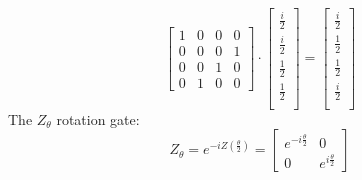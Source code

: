 \documentclass{article}
\begin{document}
\begin{itemize}
\begin{figure}[H]
    \end{figure}
    \[
        \begin{bmatrix}
            1 & 0 & 0 & 0\\
            0 & 0 & 0 & 1\\
            0 & 0 & 1 & 0\\
            0 & 1 & 0 & 0
        \end{bmatrix}
        \cdot
        \begin{bmatrix}
            \frac{i}{2} \\
            \frac{i}{2} \\
            \frac{1}{2} \\
            \frac{1}{2} \\
        \end{bmatrix}
        =
        \begin{bmatrix}
            \frac{i}{2} \\
            \frac{1}{2} \\
            \frac{1}{2} \\
            \frac{i}{2} \\
        \end{bmatrix}
    \]
    The \(Z_\theta\) rotation gate:
        \[
        Z_\theta = e^{-iZ(\frac{\theta}{2})} =
         \begin{bmatrix}
            e^{-i \frac{\theta}{2}} & 0\\
            0 & e^{i \frac{\theta}{2}}
        \end{bmatrix}
        \]
        

\end{itemize}
\end{document}

